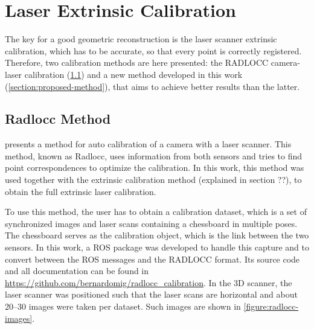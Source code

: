 \section{Laser Extrinsic Calibration}
\label{section:laser-extrinsic-calibration}

The key for a good geometric reconstruction is the laser scanner extrinsic calibration, which has to be accurate, so that every point is correctly registered. Therefore, two calibration methods are here presented: the RADLOCC camera-laser calibration (\cref{section:radlocc-method}) and a new method developed in this work (\cref{section:proposed-method}), that aims to achieve better results than the latter. 

\subsection{Radlocc Method}
\label{section:radlocc-method}

\cite{zhang04} presents a method for auto calibration of a camera with a laser scanner. This method, known as Radlocc, uses information from both sensors and tries to find point correspondences to optimize the calibration. In this work, this method was used together with the extrinsic calibration method (explained in section ??), to obtain the full extrinsic laser calibration.

To use this method, the user has to obtain a calibration dataset, which is a set of synchronized images and laser scans containing a chessboard in multiple poses. The chessboard serves as the calibration object, which is the link between the two sensors. In this work, a ROS package was developed to handle this capture and to convert between the ROS messages and the RADLOCC format. Its source code and all documentation can be found in \url{https://github.com/bernardomig/radlocc_calibration}. In the 3D scanner, the laser scanner was positioned such that the laser scans are horizontal and about \numrange{20}{30} images were taken per dataset. Such images are shown in \cref{figure:radlocc-images}.


